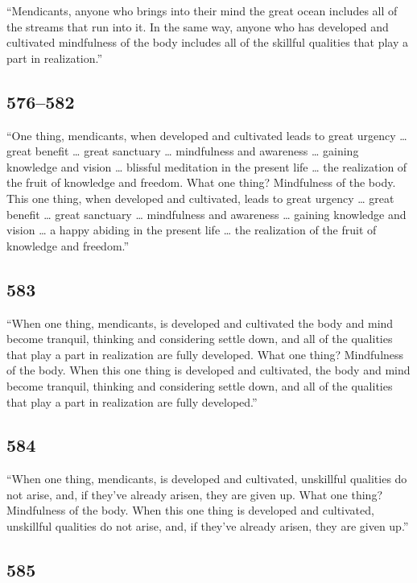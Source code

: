 \documentclass[12pt,openany]{book}%
\begin{document}
“Mendicants, anyone who brings into their mind the great ocean includes all of the streams that run into it. In the same way, anyone who has developed and cultivated mindfulness of the body includes all of the skillful qualities that play a part in realization.” 

\subsection*{576–582 }

“One thing, mendicants, when developed and cultivated leads to great urgency … great benefit … great sanctuary … mindfulness and awareness … gaining knowledge and vision … blissful meditation in the present life … the realization of the fruit of knowledge and freedom. What one thing? Mindfulness of the body. This one thing, when developed and cultivated, leads to great urgency … great benefit … great sanctuary … mindfulness and awareness … gaining knowledge and vision … a happy abiding in the present life … the realization of the fruit of knowledge and freedom.” 

\subsection*{583 }

“When one thing, mendicants, is developed and cultivated the body and mind become tranquil, thinking and considering settle down, and all of the qualities that play a part in realization are fully developed. What one thing? Mindfulness of the body. When this one thing is developed and cultivated, the body and mind become tranquil, thinking and considering settle down, and all of the qualities that play a part in realization are fully developed.” 

\subsection*{584 }

“When one thing, mendicants, is developed and cultivated, unskillful qualities do not arise, and, if they’ve already arisen, they are given up. What one thing? Mindfulness of the body. When this one thing is developed and cultivated, unskillful qualities do not arise, and, if they’ve already arisen, they are given up.” 

\subsection*{585 }
\end{document}
